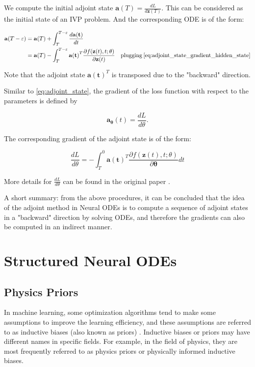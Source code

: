 \documentclass[
	parskip, 			   %
	twoside, 			   %
	DIV=14, 			   %
	BCOR=15.0mm, 		   %
	headsepline, 		   %
	open=right, 		   %
	captions=tableheading, %
	bibliography=totoc,    %
	numbers=noenddot       %
]{scrreprt}
\begin{document}
We compute the initial adjoint state $\mathbf{a}(T) = \frac{d L}{d\mathbf{z}(T)}$. This can be considered as the initial state of an IVP problem. And the corresponding ODE is of the form:

\begin{equation}
    \label{eq:adjoint_state_ODE}
    \begin{aligned}
    \mathbf{a}(T-\varepsilon) &= \mathbf{a}(T) + \int_{T}^{T-\varepsilon} \frac{d\mathbf{a(t)}}{dt} \\
    &= \mathbf{a}(T) - \int_{T}^{T-\varepsilon} \mathbf{a(t)}^T \frac{\partial f(\mathbf{z}(t), t; \theta)}{\partial \mathbf{z}(t)} \quad \text{plugging} \: \ref{eq:adjoint_state_gradient_hidden_state} \\ 
    \end{aligned}
\end{equation}

Note that the adjoint state $\mathbf{a(t)}^T$ is transposed due to the "backward" direction.

Similar to \ref{eq:adjoint_state}, the gradient of the loss function with respect to the parameters is defined by

\begin{equation}
    \label{eq:adjoint_state_parameters}
    \mathbf{a_\theta}(t) = \frac{d L}{d\theta}.
\end{equation}

The corresponding gradient of the adjoint state is of the form:

\begin{equation}
    \label{eq:adjoint_state_gradient_parameters}
    \frac{d L}{d\theta} = - \int_{T}^{0} \mathbf{a(t)}^T \frac{\partial f(\mathbf{z}(t), t; \theta)}{\partial \mathbf{\theta}} dt
\end{equation}


More details for $\frac{d L}{d\theta}$ can be found in the original paper \cite{chen2018neural}.

A short summary: from the above procedures, it can be concluded that the idea of the adjoint method in Neural ODEs is to compute a sequence of adjoint states in a "backward" direction by solving ODEs, and therefore the gradients can also be computed in an indirect manner.


\clearpage
\chapter{Structured Neural ODEs}
\label{ch:chapter6}
\section{Physics Priors}
In machine learning, some optimization algorithms tend to make some assumptions to improve the learning efficiency, and these assumptions are referred to as inductive biases (also known as priors) \cite{mitchell1997machine}. Inductive biases or priors may have different names in specific fields. For example, in the field of physics, they are most frequently referred to as physics priors or physically informed inductive biases.
\end{document}
